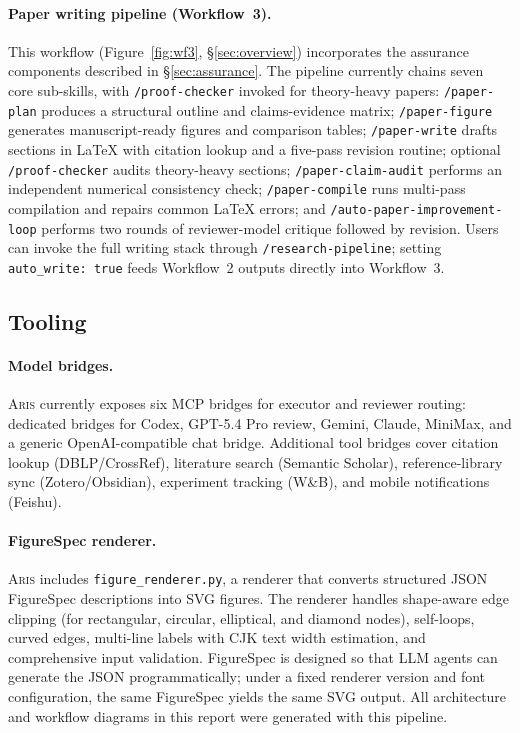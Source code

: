 \documentclass{article}
\newcommand{\aris}{\textsc{Aris}}
\theoremstyle{remark}
\begin{document}
\paragraph{Paper writing pipeline (Workflow~3).}
This workflow (Figure~\ref{fig:wf3}, \S\ref{sec:overview}) incorporates the assurance components described in \S\ref{sec:assurance}.
The pipeline currently chains seven core sub-skills, with \texttt{/proof-checker} invoked for theory-heavy papers:
\texttt{/paper-plan} produces a structural outline and claims-evidence matrix;
\texttt{/paper-figure} generates manuscript-ready figures and comparison tables;
\texttt{/paper-write} drafts sections in \LaTeX{} with citation lookup and a five-pass revision routine;
optional \texttt{/proof-checker} audits theory-heavy sections;
\texttt{/paper-claim-audit} performs an independent numerical consistency check;
\texttt{/paper-compile} runs multi-pass compilation and repairs common \LaTeX{} errors;
and \texttt{/auto-paper-improvement-loop} performs two rounds of reviewer-model critique followed by revision.
Users can invoke the full writing stack through \texttt{/research-pipeline}; setting \texttt{auto\_write: true} feeds Workflow~2 outputs directly into Workflow~3.

\subsection{Tooling}
\label{sec:tools}

\paragraph{Model bridges.}
\aris{} currently exposes six MCP bridges for executor and reviewer routing: dedicated bridges for Codex, GPT-5.4 Pro review, Gemini, Claude, MiniMax, and a generic OpenAI-compatible chat bridge.
Additional tool bridges cover citation lookup (DBLP/CrossRef), literature search (Semantic Scholar), reference-library sync (Zotero/Obsidian), experiment tracking (W\&B), and mobile notifications (Feishu).

\paragraph{FigureSpec renderer.}
\aris{} includes \texttt{figure\_renderer.py}, a renderer that converts structured JSON FigureSpec descriptions into SVG figures.
The renderer handles shape-aware edge clipping (for rectangular, circular, elliptical, and diamond nodes), self-loops, curved edges, multi-line labels with CJK text width estimation, and comprehensive input validation.
FigureSpec is designed so that LLM agents can generate the JSON programmatically; under a fixed renderer version and font configuration, the same FigureSpec yields the same SVG output.
All architecture and workflow diagrams in this report were generated with this pipeline.
\end{document}
